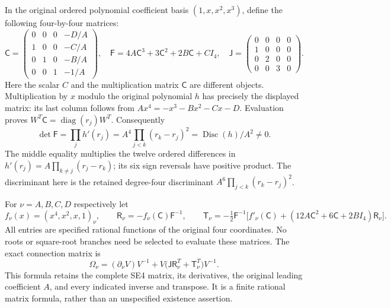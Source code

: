 In the original ordered polynomial coefficient basis $(1,x,x^2,x^3)$,
define the following four-by-four matrices:
\[
 \mathsf C=\begin{pmatrix}
 0&0&0&-D/A\\1&0&0&-C/A\\0&1&0&-B/A\\0&0&1&-1/A
 \end{pmatrix},\quad
 \mathsf F=4A\mathsf C^3+3\mathsf C^2+2B\mathsf C+CI_4,
 \quad
 \mathsf J=\begin{pmatrix}0&0&0&0\\1&0&0&0\\0&2&0&0\\0&0&3&0\end{pmatrix}.
 \tag{SC2}
\]
Here the scalar $C$ and the multiplication matrix $\mathsf C$ are
different objects. Multiplication by $x$ modulo the original polynomial
$h$ has precisely the displayed matrix: its last column follows from
$Ax^4=-x^3-Bx^2-Cx-D$. Evaluation proves
$W^T\mathsf C=\operatorname{diag}(r_j)W^T$. Consequently
\[
 \det\mathsf F=\prod_jh'(r_j)
   =A^4\prod_{j<k}(r_k-r_j)^2
   =\operatorname{Disc}(h)/A^2\ne0.
 \tag{SC3}
\]
The middle equality multiplies the twelve ordered differences in
$h'(r_j)=A\prod_{k\ne j}(r_j-r_k)$; its six sign reversals have
positive product. The discriminant here is the retained degree-four
discriminant $A^6\prod_{j<k}(r_k-r_j)^2$.

For $\nu=A,B,C,D$ respectively let
\[
 f_\nu(x)=(x^4,x^2,x,1)_\nu,\qquad
 \mathsf R_\nu=-f_\nu(\mathsf C)\mathsf F^{-1},\qquad
 \mathsf T_\nu=-\tfrac12\mathsf F^{-1}
 \bigl[f'_\nu(\mathsf C)
 +(12A\mathsf C^2+6\mathsf C+2BI_4)\mathsf R_\nu\bigr].
 \tag{SC4}
\]
All entries are specified rational functions of the original four
coordinates. No roots or square-root branches need be selected to
evaluate these matrices. The exact connection matrix is
\[
 \boxed{\quad
 \Omega_\nu=(\partial_\nu V)V^{-1}
       +V\bigl(\mathsf J\mathsf R_\nu^T+
                           \mathsf T_\nu^T\bigr)V^{-1}.
 \quad} \tag{SC5}
\]
This formula retains the complete SE4 matrix, its derivatives, the
original leading coefficient $A$, and every indicated inverse and
transpose. It is a finite rational matrix formula, rather than an
unspecified existence assertion.

